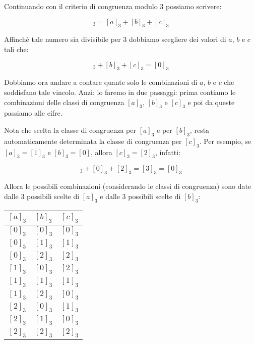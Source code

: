 \begin{soluzione}
    Continuando con il criterio di congruenza modulo 3 possiamo scrivere:

    \begin{equation*}
        [a + b + c]_3 = [a]_3 + [b]_3 + [c]_3
    \end{equation*}

    Affinchè tale numero sia divisibile per 3 dobbiamo scegliere dei valori di $a$, $b$ e $c$ tali che:

    \begin{equation*}
        [a]_3 + [b]_3 + [c]_3 = [0]_3
    \end{equation*}

    Dobbiamo ora andare a contare quante solo le combinazioni di $a$, $b$ e $c$ che soddisfano tale vincolo. Anzi: lo
    faremo in due passaggi: prima contiamo le combinazioni delle classi di congruenza $[a]_3$, $[b]_3$ e $[c]_3$ e poi
    da queste passiamo alle cifre.

    Nota che scelta la classe di congruenza per $[a]_3$ e per $[b]_3$, resta automaticamente determinata la classe di
    congruenza per $[c]_3$.
    Per esempio, se $[a]_3 = [1]_3$ e $[b]_3 = [0]$, allora $[c]_3 =  [2]_3$, infatti:

    \begin{equation*}
        [1]_3 + [0]_3 + [2]_3 = [3]_3 = [0]_3
    \end{equation*}

    Allora le possibili combinazioni (considerando le classi di congruenza) sono date dalle 3 possibili scelte di $[a]_3$
    e dalle 3 possibili scelte di $[b]_3$:

    \begin{table}[H]
        \label{tab:distrettuali_2019_1}
        \centering
        \begin{tabular}{ccc}
            \toprule
            $[a]_3$ & $[b]_3$ & $[c]_3$ \\
            \midrule
            $[0]_3$ & $[0]_3$ & $[0]_3$ \\
            $[0]_3$ & $[1]_3$ & $[1]_3$ \\
            $[0]_3$ & $[2]_3$ & $[2]_3$ \\
            $[1]_3$ & $[0]_3$ & $[2]_3$ \\
            $[1]_3$ & $[1]_3$ & $[1]_3$ \\
            $[1]_3$ & $[2]_3$ & $[0]_3$ \\
            $[2]_3$ & $[0]_3$ & $[1]_3$ \\
            $[2]_3$ & $[1]_3$ & $[0]_3$ \\
            $[2]_3$ & $[2]_3$ & $[2]_3$ \\
            \bottomrule
        \end{tabular}
    \end{table}


\end{soluzione}

